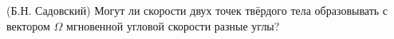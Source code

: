 (Б.Н. Садовский)
Могут ли скорости двух точек твёрдого тела образовывать с вектором 
$\Omega$ мгновенной угловой скорости разные углы?
